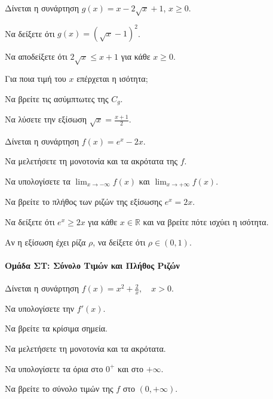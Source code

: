 \documentclass[11pt,a4paper,modern]{FFExercises}
\begin{document}
\askhsh
Δίνεται η συνάρτηση $g(x) = x - 2\sqrt{x} + 1$, $x \ge 0$.
\begin{alist}
    \item Να δείξετε ότι $g(x) = (\sqrt{x} - 1)^2$.
    \item Να αποδείξετε ότι $2\sqrt{x} \le x + 1$ για κάθε $x \ge 0$.
    \item Για ποια τιμή του $x$ επέρχεται η ισότητα;
    \item Να βρείτε τις ασύμπτωτες της $C_g$.
    \item Να λύσετε την εξίσωση $\sqrt{x} = \frac{x+1}{2}$.
\end{alist}

\askhsh
Δίνεται η συνάρτηση $f(x) = e^x - 2x$.
\begin{alist}
    \item Να μελετήσετε τη μονοτονία και τα ακρότατα της $f$.
    \item Να υπολογίσετε τα $\displaystyle\lim_{x \to -\infty} f(x)$ και $\displaystyle\lim_{x \to +\infty} f(x)$.
    \item Να βρείτε το πλήθος των ριζών της εξίσωσης $e^x = 2x$.
    \item Να δείξετε ότι $e^x \ge 2x$ για κάθε $x \in \mathbb{R}$ και να βρείτε πότε ισχύει η ισότητα.
    \item Αν η εξίσωση έχει ρίζα $\rho$, να δείξετε ότι $\rho \in (0, 1)$.
\end{alist}



\paragraph{Ομάδα ΣΤ: Σύνολο Τιμών και Πλήθος Ριζών}

\askhsh
Δίνεται η συνάρτηση $f(x) = x^2 + \frac{2}{x}, \quad x > 0$.
\begin{alist}
    \item Να υπολογίσετε την $f'(x)$.
    \item Να βρείτε τα κρίσιμα σημεία.
    \item Να μελετήσετε τη μονοτονία και τα ακρότατα.
    \item Να υπολογίσετε τα όρια στο $0^+$ και στο $+\infty$.
    \item Να βρείτε το σύνολο τιμών της $f$ στο $(0, +\infty)$.
\end{alist}
\end{document}
